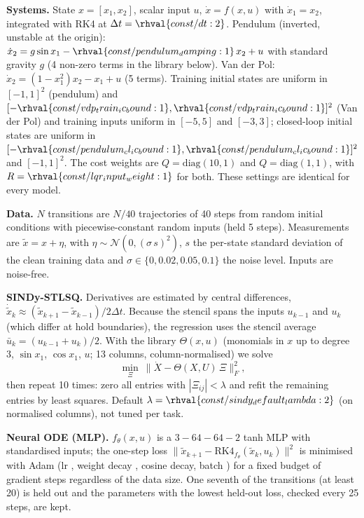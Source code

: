 \textbf{Systems.} State $x=[x_1,x_2]$, scalar input $u$, $\dot x = f(x,u)$ with $\dot x_1=x_2$, integrated with RK4 at $\Delta t=\rhval{const/dt:2}$. Pendulum (inverted, unstable at the origin): $\dot x_2 = g\sin x_1 - \rhval{const/pendulum_damping:1}\,x_2 + u$ with standard gravity $g$ (4 non-zero terms in the library below). Van der Pol: $\dot x_2 = (1-x_1^2)x_2 - x_1 + u$ (5 terms). Training initial states are uniform in $[-1,1]^2$ (pendulum) and $[-\rhval{const/vdp_train_ic_bound:1},\rhval{const/vdp_train_ic_bound:1}]^2$ (Van der Pol) and training inputs uniform in $[-5,5]$ and $[-3,3]$; closed-loop initial states are uniform in $[-\rhval{const/pendulum_cl_ic_bound:1},\rhval{const/pendulum_cl_ic_bound:1}]^2$ and $[-1,1]^2$. The cost weights are $Q=\mathrm{diag}(10,1)$ and $Q=\mathrm{diag}(1,1)$, with $R=\rhval{const/lqr_input_weight:1}$ for both. These settings are identical for every model.

\textbf{Data.} $N$ transitions are $N/40$ trajectories of 40 steps from random initial conditions with piecewise-constant random inputs (held 5 steps). Measurements are $\tilde x = x + \eta$, with $\eta\sim\mathcal N(0,(\sigma\, s)^2)$, $s$ the per-state standard deviation of the clean training data and $\sigma\in\{0,0.02,0.05,0.1\}$ the noise level. Inputs are noise-free.

\textbf{SINDy-STLSQ.} Derivatives are estimated by central differences, $\dot{\tilde x}_k\approx(\tilde x_{k+1}-\tilde x_{k-1})/2\Delta t$. Because the stencil spans the inputs $u_{k-1}$ and $u_k$ (which differ at hold boundaries), the regression uses the stencil average $\bar u_k=(u_{k-1}+u_k)/2$. With the library $\Theta(x,u)$ (monomials in $x$ up to degree 3, $\sin x_1$, $\cos x_1$, $u$; 13 columns, column-normalised) we solve
\begin{equation}
\min_{\Xi}\ \|\dot X-\Theta(X,U)\,\Xi\|_F^2 ,
\end{equation}
then repeat 10 times: zero all entries with $|\Xi_{ij}|<\lambda$ and refit the remaining entries by least squares. Default $\lambda=\rhval{const/sindy_default_lambda:2}$ (on normalised columns), not tuned per task.

\textbf{Neural ODE (MLP).} $f_\theta(x,u)$ is a $3\!-\!64\!-\!64\!-\!2$ tanh MLP with standardised inputs; the one-step loss $\|\tilde x_{k+1}-\mathrm{RK4}_{f_\theta}(\tilde x_k,u_k)\|^2$ is minimised with Adam (lr , weight decay , cosine decay, batch ) for a fixed budget of  gradient steps regardless of the data size. One seventh of the transitions (at least 20) is held out and the parameters with the lowest held-out loss, checked every 25 steps, are kept.

